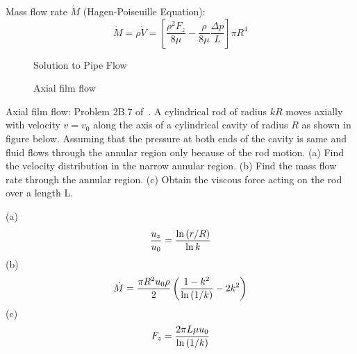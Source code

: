 Mass flow rate $\dot{M}$ (Hagen-Poiseuille Equation):
$$ \boxed{\dot{M} = \rho \dot{V} = \left[ \frac{\rho^2 F_z}{8 \mu}-\frac{\rho}{8\mu}\frac{\Delta p}{L} \right] \pi R^4} $$

\begin{figure}[h]
\begin{center}
\end{center}
\caption{Solution to Pipe Flow}
\label{pfslfg}
\end{figure}

\begin{figure}[h]
\label{axialfilmflow}
\begin{center}
\end{center}
\caption{Axial film flow}
\end{figure}

\begin{question}
Axial film flow: Problem 2B.7 of~\cite{bls}. A cylindrical rod of radius $kR$ moves axially with velocity $v=v_0$ along the axis of a cylindrical cavity of radius $R$ as shown in figure below. Assuming that the pressure at both ends of the cavity is same and fluid flows through the annular region only because of the rod motion. (a) Find the velocity distribution in the narrow annular region. (b) Find the mass flow rate through the annular region. (c) Obtain the viscous force acting on the rod over a length L.\\
\end{question}
\begin{solution}[print]
(a) $$ {u_z \over u_0} = { \ln \left( r / R \right) \over \ln k} $$
(b) $$ \dot{M} = {\pi R^2 u_0 \rho \over 2} \left( {1 - k^2 \over \ln \left(1 /k\right)} - 2 k^2 \right)$$
(c) $$ F_z = {2 \pi L \mu u_0 \over \ln \left( 1 / k \right)} $$
\end{solution}

